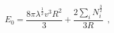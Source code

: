 \begin{equation}
E_0=\frac{8\pi \lambda^{\frac{1}{2}}v^3R^2}{3}
	+\frac{2\sum_iN_i^{\frac{3}{2}}}{3R}~~,
\label{E0.eqn2}
\end{equation}

